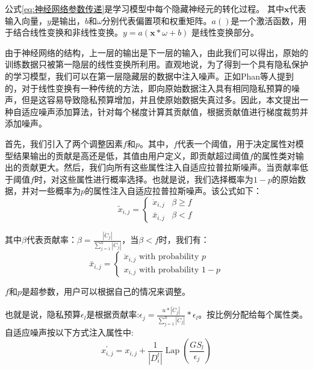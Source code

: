 公式\ref{eq:神经网络参数传递}是学习模型中每个隐藏神经元的转化过程。
其中$\mathbf{x}$代表输入向量，$y$是输出，$b$和$\omega$分别代表偏置项和权重矩阵。$a()$是一个激活函数，用于结合线性变换和非线性变换。$y=a(\mathbf{x} * \omega+b)$ 是线性变换部分。

由于神经网络的结构，上一层的输出是下一层的输入，由此我们可以得出，原始的训练数据只被第一隐层的线性变换所利用。直观地说，为了得到一个具有隐私保护的学习模型，我们可以在第一层隐藏层的数据中注入噪声。正如Phan等人提到的，对于线性变换有一种传统的方法，即向原始数据注入具有相同隐私预算的噪声，但是这容易导致隐私预算增加，并且使原始数据失真过多。因此，本文提出一种自适应噪声添加算法，针对每个梯度计算其贡献值，根据贡献值进行梯度裁剪并添加噪声。

首先，我们引入了两个调整因素$f$和$p$。其中，$f$代表一个阈值，用于决定属性对模型结果输出的贡献是高还是低，其值由用户定义，即贡献超过阈值$f$的属性类对输出的贡献更大。然后，我们向所有这些属性注入自适应拉普拉斯噪声。当贡献率低于阈值$f$时，对这些属性进行概率选择。也就是说，我们选择概率为$1-p$的原始数据，并对一些概率为$p$的属性注入自适应拉普拉斯噪声。该公式如下：
\begin{equation}\label{eq:神经网络加噪}
\tilde{x}_{i, j}=\left\{\begin{array}{ll}
\ddot{x}_{i, j} & \beta \geq f \\
\bar{x}_{i, j} & \beta<f
\end{array}\right.
\end{equation}

其中$\beta$代表贡献率：$\beta=\frac{\left|\ddot{C}_{j}\right|}{\sum_{j=1}^{u}\left|\ddot{C}_{j}\right|}$，当$\beta<f$时，我们有：
\begin{equation}\label{eq:神经网络加噪2}
\bar{x}_{i, j}=\left\{\begin{array}{l}
\ddot{x}_{i, j} \text { with probability } p \\
x_{i, j} \text { with probability } 1-p
\end{array}\right.
\end{equation}


$f$和$p$是超参数，用户可以根据自己的情况来调整。

也就是说，隐私预算$\epsilon_{l}$是根据贡献率:$\epsilon_{j}=\frac{u *\left|\ddot{C}_{j}\right|}{\sum_{j=1}^{u}\left|\ddot{C}_{j}\right|} * \epsilon_{l}$。按比例分配给每个属性类。自适应噪声按以下方式注入属性中:
\begin{equation}\label{eq:神经网络加噪3}
x_{i, j}^{\prime}=x_{i, j}+\frac{1}{\left|D_{i}^{t}\right|} \operatorname{Lap}\left(\frac{G S_{l}}{\epsilon_{j}}\right)
\end{equation}

